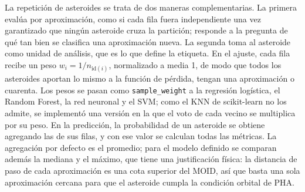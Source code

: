 \documentclass[conference]{IEEEtran}
\newcommand{\code}[1]{\texttt{#1}}
\begin{document}
\begin{table}[t]
\centering
\caption{Modelos, mallas de hiperparámetros y configuración seleccionada por PR-AUC de validación, por fila y por asteroide (con pesos $1/n$). La última fila es la malla ampliada del modelo definido (Sección~\ref{sec:rf}).}
\label{tab:grids}
\footnotesize
{}
\end{table}

La repetición de asteroides se trata de dos maneras complementarias. La primera evalúa por aproximación, como si cada fila fuera independiente una vez garantizado que ningún asteroide cruza la partición; responde a la pregunta de qué tan bien se clasifica una aproximación nueva. La segunda toma al asteroide como unidad de análisis, que es lo que define la etiqueta. En el ajuste, cada fila recibe un peso $w_i=1/n_{\mathrm{id}(i)}$, normalizado a media 1, de modo que todos los asteroides aportan lo mismo a la función de pérdida, tengan una aproximación o cuarenta. Los pesos se pasan como \code{sample\_weight} a la regresión logística, el Random Forest, la red neuronal y el SVM; como el KNN de scikit-learn no los admite, se implementó una versión en la que el voto de cada vecino se multiplica por su peso. En la predicción, la probabilidad de un asteroide se obtiene agregando las de sus filas, y con ese valor se calculan todas las métricas. La agregación por defecto es el promedio; para el modelo definido se comparan además la mediana y el máximo, que tiene una justificación física: la distancia de paso de cada aproximación es una cota superior del MOID, así que basta una sola aproximación cercana para que el asteroide cumpla la condición orbital de PHA.
\end{document}
